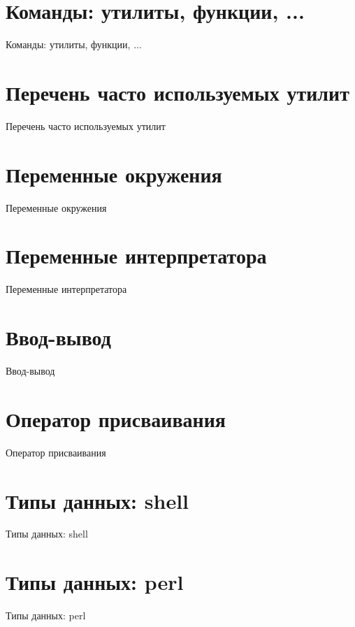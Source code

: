 \documentclass[hyperref={unicode=true}]{beamer}
\begin{document}
\newcommand{\iframe}[1]{
\section{#1}\begin{frame}[fragile]{#1}\par\vspace{-1em}
}
\newcommand{\pframe}[1]{
\begin{frame}[fragile]{#1}\par\vspace{-1em}
}


\iframe{Команды: утилиты, функции, ...}
\end{frame}

\iframe{Перечень часто используемых утилит}
\end{frame}

\iframe{Переменные окружения}
\end{frame}

\iframe{Переменные интерпретатора}
\end{frame}

\iframe{Ввод-вывод}
\end{frame}

\iframe{Оператор присваивания}
\end{frame}

\iframe{Типы данных: shell}
\end{frame}

\iframe{Типы данных: perl}
\end{frame}
\end{document}
